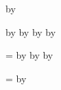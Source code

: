 \newcount\CollaboratorJ
{}
\advance\CollaboratorCitations by \CollaboratorJ



\newcount\TotalCitations
{}

\advance\TotalCitations by \FirstAuthorCitations
\advance\TotalCitations by \StudentAuthorCitations
\advance\TotalCitations by \CoauthorCitations
\advance\TotalCitations by \CollaboratorCitations


\newcount\FirstAuthorPublications
{}

\newcount\StudentPublications
{}

\newcount\CoauthorPublications
{}

\newcount\CollaborativePublications
{}

\newcount\AllPublications
\AllPublications=\FirstAuthorPublications
\advance\AllPublications by \StudentPublications
\advance\AllPublications by \CoauthorPublications
\advance\AllPublications by \CollaborativePublications

\newcount\AllCollaborativePublications
\AllCollaborativePublications=\CoauthorPublications
\advance\AllCollaborativePublications by \CollaborativePublications
